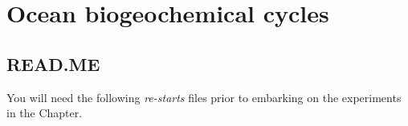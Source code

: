 
\cleardoublepage


\chapter{Ocean biogeochemical cycles}\label{ch:ocean-biogeochem}

\hfill \break

\vspace{24mm}

\noindent

\newpage

\section*{READ.ME}

You will need the following \textit{re-starts} files prior to embarking on the experiments in the Chapter.
\vspace{1mm}

